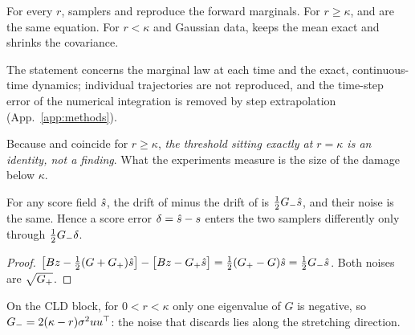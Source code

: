 \begin{proposition}
\label{prop:exact}
For every $r$, samplers \Sb{} and \Sc{} reproduce the forward marginals.
For $r\geq\kappa$, \Sa{} and \Sb{} are the same equation.
For $r<\kappa$ and Gaussian data, \Sa{} keeps the mean exact and shrinks the covariance.
\end{proposition}

The statement concerns the marginal law at each time and the exact, continuous-time dynamics; individual trajectories are not reproduced, and the time-step error of the numerical integration is removed by step extrapolation (App.~\ref{app:methods}).

Because \Sa{} and \Sb{} coincide for $r\geq\kappa$, \emph{the threshold sitting exactly at $r=\kappa$ is an identity, not a finding}.
What the experiments measure is the size of the damage below $\kappa$.

\begin{proposition}
\label{prop:difference}
For any score field $\hat s$, the drift of \Sb{} minus the drift of \Sa{} is $\tfrac12G_{-}\hat s$, and their noise is the same.
Hence a score error $\delta=\hat s-s$ enters the two samplers differently only through $\tfrac12G_{-}\delta$.
\end{proposition}
\begin{proof}
$\bigl[Bz-\tfrac12(G+G_{+})\hat s\bigr]-\bigl[Bz-G_{+}\hat s\bigr]=\tfrac12(G_{+}-G)\hat s=\tfrac12G_{-}\hat s$.
Both noises are $\sqrt{G_{+}}$.
\end{proof}

On the CLD block, for $0<r<\kappa$ only one eigenvalue of $G$ is negative, so $G_{-}=2(\kappa-r)\sigma^2uu^{\top}$: the noise that \Sa{} discards lies along the stretching direction.
